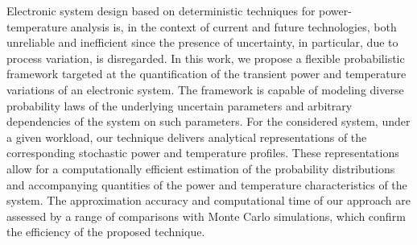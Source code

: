 Electronic system design based on deterministic techniques for power-temperature analysis is, in the context of current and future technologies, both unreliable and inefficient since the presence of uncertainty, in particular, due to process variation, is disregarded.
In this work, we propose a flexible probabilistic framework targeted at the quantification of the transient power and temperature variations of an electronic system.
The framework is capable of modeling diverse probability laws of the underlying uncertain parameters and arbitrary dependencies of the system on such parameters.
For the considered system, under a given workload, our technique delivers analytical representations of the corresponding stochastic power and temperature profiles.
These representations allow for a computationally efficient estimation of the probability distributions and accompanying quantities of the power and temperature characteristics of the system.
The approximation accuracy and computational time of our approach are assessed by a range of comparisons with Monte Carlo simulations, which confirm the efficiency of the proposed technique.
